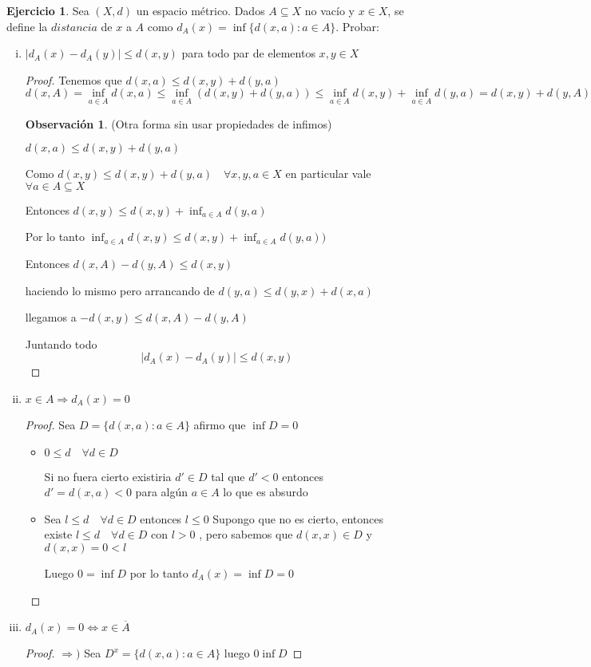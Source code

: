 \documentclass[11pt]{report}
\newcommand{\Ra}{\Rightarrow}
\newcommand{\ol}{\overline}
\theoremstyle{definition}
\newtheorem*{remark}{Observación}
\newtheorem{ej}{Ejercicio}
\begin{document}
\begin{ej}
  Sea $(X,d)$ un espacio métrico. Dados $A \subseteq X$ no vacío y $x \in X$, se define la $distancia$ de $x$ a $A$ como $d_A(x) = \inf{\{d(x,a):a\in A \}}$. Probar:
  \begin{enumerate}[i.]
    \item $|d_A(x) - d_A(y)| \leq d(x,y)$ para todo par de elementos $x,y \in X$
      \begin{proof}
	Tenemos que $d(x,a) \leq d(x,y) + d(y,a)$ 
	$$d(x,A)  = \inf_{a\in A} d(x,a) \leq \inf_{a \in A} (d(x,y) + d(y,a)) \leq \inf_{a \in A} d(x,y) + \inf_{a \in A} d(y,a) = d(x,y) + d(y,A)$$

	\begin{remark}
		(Otra forma sin usar propiedades de infimos)

	$d(x,a) \leq d(x,y) + d(y,a)$

	Como  $ d(x,y) \leq d(x,y) + d(y,a)\quad \forall x,y,a \in X$ en particular vale $\forall a \in A\subseteq X$ 

	Entonces $  d(x,y) \leq d(x,y) + \inf_{a \in A}d(y,a)$

	Por lo tanto $\inf_{a \in A} d(x,y) \leq d(x,y) + \inf_{a \in A}d(y,a)) $
\end{remark}
	Entonces $d(x,A) - d(y,A) \leq d(x,y)$

	haciendo lo mismo pero arrancando de $d(y,a) \leq d(y,x) + d(x,a)$

	llegamos a $- d(x,y) \leq d(x,A) - d(y,A)$

	Juntando todo
	$$ |d_A(x) - d_A(y) | \leq d(x,y) $$
      \end{proof} 
    \item $x \in A \Ra d_A(x)=0$
      \begin{proof}
	Sea $D = \{d(x,a) : a \in A\}$ afirmo que $\inf D = 0$
	\begin{itemize}
	  \item $0 \leq d \quad \forall d \in D$ 

	    Si no fuera cierto existiria $d' \in D$ tal que $d' < 0$ entonces $d' = d(x,a) < 0$ para algún $a \in A$ lo que es absurdo
	  \item Sea $l \leq d \quad \forall d \in D $ entonces $l \leq 0$ Supongo que no es cierto, entonces existe $l \leq d \quad \forall d \in D$ con $l > 0$ , pero sabemos que $d(x,x) \in D$ y $d(x,x) = 0 < l$

	    Luego $0 = \inf D$ por lo tanto $d_{A}(x) = \inf D = 0$ 
	  \end{itemize}
	  \end{proof}
	\item $d_A(x) = 0 \iff x \in \ol A$
	  \begin{proof}
	  $\Ra )$ Sea $D^x = \{d(x,a):a\in A\}$ luego $0 \inf D$ 


\end{proof}
\end{enumerate}
\end{ej}
\end{document}
